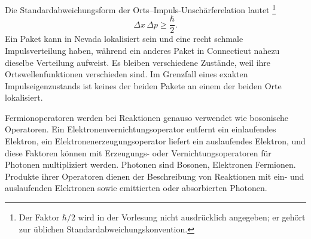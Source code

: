 \begin{classroomqa}
\end{classroomqa}

\begin{classroomqa}
\end{classroomqa}

Die Standardabweichungsform der Orts--Impuls-Unschärferelation lautet
\footnote{Der Faktor \(\hbar/2\) wird in der Vorlesung nicht ausdrücklich angegeben; er gehört zur üblichen Standardabweichungskonvention.}
\begin{equation}
\Delta x\,\Delta p\geq\frac{\hbar}{2}.
\end{equation}
Ein Paket kann in Nevada lokalisiert sein und eine recht schmale Impulsverteilung haben, während ein anderes Paket in Connecticut nahezu dieselbe Verteilung aufweist. Es bleiben verschiedene Zustände, weil ihre Ortswellenfunktionen verschieden sind. Im Grenzfall eines exakten Impulseigenzustands ist keines der beiden Pakete an einem der beiden Orte lokalisiert.

Fermionoperatoren werden bei Reaktionen genauso verwendet wie bosonische Operatoren. Ein Elektronenvernichtungsoperator entfernt ein einlaufendes Elektron, ein Elektronenerzeugungsoperator liefert ein auslaufendes Elektron, und diese Faktoren können mit Erzeugungs- oder Vernichtungsoperatoren für Photonen multipliziert werden. Photonen sind Bosonen, Elektronen Fermionen. Produkte ihrer Operatoren dienen der Beschreibung von Reaktionen mit ein- und auslaufenden Elektronen sowie emittierten oder absorbierten Photonen.

